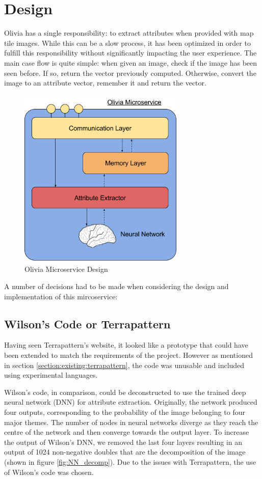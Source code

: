 \section{Design}

Olivia has a single responsibility: to extract attributes when provided with map tile images. While this can be a slow process, it has been optimized in order to fulfill this responsibility without significantly impacting the user experience. The main case flow is quite simple: when given an image, check if the image has been seen before. If so, return the vector previously computed. Otherwise, convert the image to an attribute vector, remember it and return the vector. 

\begin{figure}[H]
    \centering
    \includegraphics[width=8cm]{figs/7/olivia_design}
    \caption{Olivia Microservice Design}
    \label{fig:olivia_design}
\end{figure}

A number of decisions had to be made when considering the design and implementation of this mircoservice:

\subsection{Wilson’s Code or Terrapattern}

Having seen Terrapattern’s website, it looked like a prototype that could have been extended to match the requirements of the project. However as mentioned in section \ref{section:existing:terrapattern}, the code was unusable and included using experimental languages. 

Wilson’s code, in comparison, could be deconstructed to use the trained deep neural network (DNN) for attribute extraction. Originally, the network produced four outputs, corresponding to the probability of the image belonging to four major themes. The number of nodes in neural networks diverge as they reach the centre of the network and then converge towards the output layer. To increase the output of Wilson’s DNN, we removed the last four layers resulting in an output of 1024 non-negative doubles that are the decomposition of the image (shown in figure \ref{fig:NN_decomp}). Due to the issues with Terrapattern, the use of Wilson’s code was chosen. 


